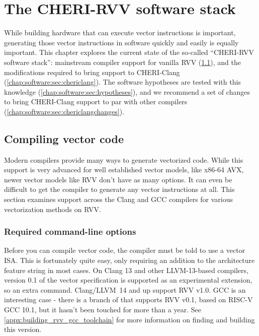 \chapter{The CHERI-RVV software stack\label{chap:software}}
While building hardware that can execute vector instructions is important, generating those vector instructions in software quickly and easily is equally important.
This chapter explores the current state of the so-called ``CHERI-RVV software stack'': mainstream compiler support for vanilla RVV (\cref{chap:software:sec:compilersupport}), and the modifications required to bring support to CHERI-Clang (\cref{chap:software:sec:chericlang}).
The software hypotheses are tested with this knowledge (\cref{chap:software:sec:hypotheses}), and we recommend a set of changes to bring CHERI-Clang support to par with other compilers (\cref{chap:software:sec:chericlangchanges}).

\section{Compiling vector code}\label{chap:software:sec:compilersupport}
Modern compilers provide many ways to generate vectorized code.
While this support is very advanced for well established vector models, like x86-64 AVX, newer vector models like RVV don't have as many options.
It can even be difficult to get the compiler to generate any vector instructions at all.
This section examines support across the Clang and GCC compilers for various vectorization methods on RVV.

\subsection{Required command-line options}
Before you can compile vector code, the compiler must be told to use a vector ISA.
This is fortunately quite easy, only requiring an addition to the architecture feature string  in most cases.
On Clang 13 and other LLVM-13-based compilers, version 0.1 of the vector specification is supported as an experimental extension, so an extra command.
Clang/LLVM~14 and up support RVV v1.0.
GCC is an interesting case - there is a branch of  that supports RVV v0.1, based on RISC-V GCC 10.1, but it hasn't been touched for more than a year.
See \cref{appx:building_rvv_gcc_toolchain} for more information on finding and building this version.

